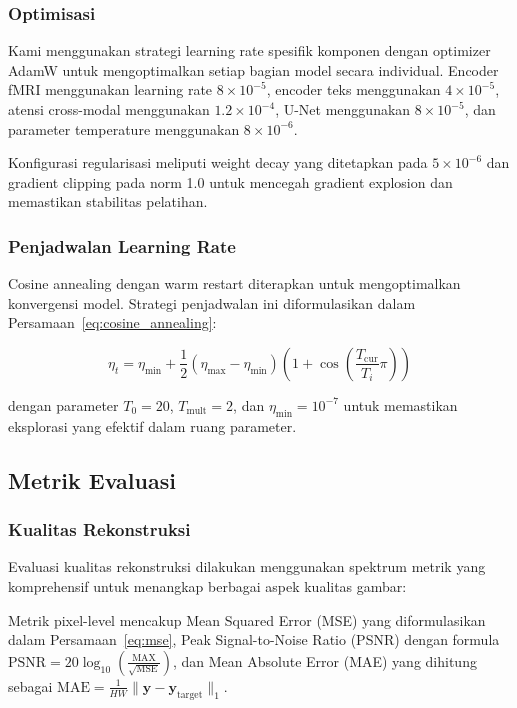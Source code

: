 \subsubsection{Optimisasi}
Kami menggunakan strategi learning rate spesifik komponen dengan optimizer AdamW untuk mengoptimalkan setiap bagian model secara individual. Encoder fMRI menggunakan learning rate $8 \times 10^{-5}$, encoder teks menggunakan $4 \times 10^{-5}$, atensi cross-modal menggunakan $1.2 \times 10^{-4}$, U-Net menggunakan $8 \times 10^{-5}$, dan parameter temperature menggunakan $8 \times 10^{-6}$.

Konfigurasi regularisasi meliputi weight decay yang ditetapkan pada $5 \times 10^{-6}$ dan gradient clipping pada norm 1.0 untuk mencegah gradient explosion dan memastikan stabilitas pelatihan.

\subsubsection{Penjadwalan Learning Rate}
Cosine annealing dengan warm restart diterapkan untuk mengoptimalkan konvergensi model. Strategi penjadwalan ini diformulasikan dalam Persamaan~\ref{eq:cosine_annealing}:

\begin{equation}
\eta_t = \eta_{\min} + \frac{1}{2}(\eta_{\max} - \eta_{\min})(1 + \cos(\frac{T_{\text{cur}}}{T_i}\pi))
\label{eq:cosine_annealing}
\end{equation}

dengan parameter $T_0 = 20$, $T_{\text{mult}} = 2$, dan $\eta_{\min} = 10^{-7}$ untuk memastikan eksplorasi yang efektif dalam ruang parameter.

\subsection{Metrik Evaluasi}

\subsubsection{Kualitas Rekonstruksi}
Evaluasi kualitas rekonstruksi dilakukan menggunakan spektrum metrik yang komprehensif untuk menangkap berbagai aspek kualitas gambar:

Metrik pixel-level mencakup Mean Squared Error (MSE) yang diformulasikan dalam Persamaan~\ref{eq:mse}, Peak Signal-to-Noise Ratio (PSNR) dengan formula $\text{PSNR} = 20 \log_{10}(\frac{\text{MAX}}{\sqrt{\text{MSE}}})$, dan Mean Absolute Error (MAE) yang dihitung sebagai $\text{MAE} = \frac{1}{HW}\|\mathbf{y} - \mathbf{y}_{\text{target}}\|_1$.

